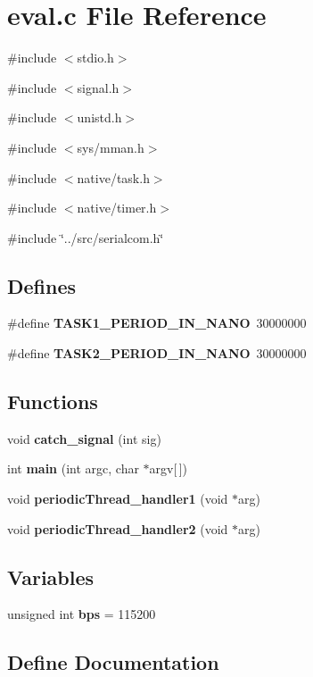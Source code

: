 \section{eval.c File Reference}
\label{eval_8c}
{\ttfamily \#include $<$stdio.h$>$}\par
{\ttfamily \#include $<$signal.h$>$}\par
{\ttfamily \#include $<$unistd.h$>$}\par
{\ttfamily \#include $<$sys/mman.h$>$}\par
{\ttfamily \#include $<$native/task.h$>$}\par
{\ttfamily \#include $<$native/timer.h$>$}\par
{\ttfamily \#include \char`\"{}../src/serialcom.h\char`\"{}}\par
\subsection*{Defines}
\begin{DoxyCompactItemize}
\item 
\#define {\bf TASK1\_\-PERIOD\_\-IN\_\-NANO}~30000000
\item 
\#define {\bf TASK2\_\-PERIOD\_\-IN\_\-NANO}~30000000
\end{DoxyCompactItemize}
\subsection*{Functions}
\begin{DoxyCompactItemize}
\item 
void {\bf catch\_\-signal} (int sig)
\item 
int {\bf main} (int argc, char $\ast$argv[$\,$])
\item 
void {\bf periodicThread\_\-handler1} (void $\ast$arg)
\item 
void {\bf periodicThread\_\-handler2} (void $\ast$arg)
\end{DoxyCompactItemize}
\subsection*{Variables}
\begin{DoxyCompactItemize}
\item 
unsigned int {\bf bps} = 115200
\end{DoxyCompactItemize}


\subsection{Define Documentation}
